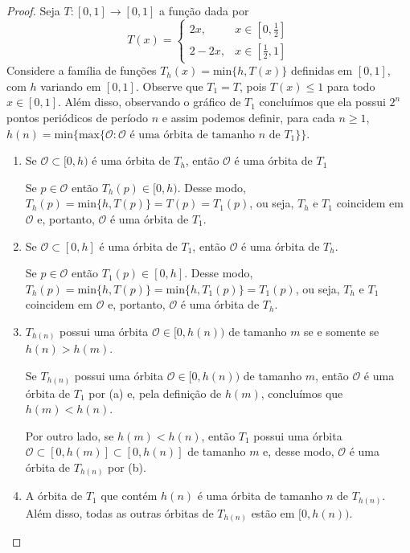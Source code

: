 \begin{proof}
Seja $T: [0,1] \to [0,1]$ a função dada por
\[
T(x) = 
  \begin{cases}
      2x, & x \in \left[0, \frac{1}{2}\right] \\
      2 - 2x, & x \in \left[\frac{1}{2}, 1\right] 
  \end{cases}
\]
Considere a família de funções $T_h(x) = \textrm{min}\{h, T(x)\}$ definidas em $[0,1]$, com $h$ variando em $[0,1]$. Observe que $T_1 = T$, pois $T(x) \leq 1$ para todo $x \in [0,1]$. Além disso, observando o gráfico de $T_1$ concluímos que ela possui $2^n$ pontos periódicos de período $n$ e assim podemos definir, para cada $n \geq 1$, $h(n) = \textrm{min} \{ \textrm{max} \{ \mathcal{O} : \mathcal{O} \textrm{ é uma órbita de tamanho } n \textrm{ de } T_1\} \}$. 

\begin{enumerate}[label = (\alph*)]
\item Se $\mathcal{O} \subset [0, h)$ é uma órbita de $T_h$, então $\mathcal{O}$ é uma órbita de $T_1$

Se $p \in \mathcal{O}$ então $T_h(p) \in [0, h)$. Desse modo, $T_h(p) = \textrm{min}\{h, T(p)\} = T(p) = T_1(p)$, ou seja, $T_h$ e $T_1$ coincidem em $\mathcal{O}$ e, portanto, $\mathcal{O}$ é uma órbita de $T_1$.

\item Se $\mathcal{O} \subset [0, h]$ é uma órbita de $T_1$, então $\mathcal{O}$ é uma órbita de $T_h$.

Se $p \in \mathcal{O}$ então $T_1(p) \in [0, h]$. Desse modo, $T_h(p) = \textrm{min}\{h, T(p)\} = \textrm{min}\{h, T_1(p)\} = T_1(p)$, ou seja, $T_h$ e $T_1$ coincidem em $\mathcal{O}$ e, portanto, $\mathcal{O}$ é uma órbita de $T_h$.

\item $T_{h(n)}$ possui uma órbita $\mathcal{O} \in [0, h(n))$ de tamanho $m$ se e somente se $h(n) > h(m)$.

Se $T_{h(n)}$ possui uma órbita $\mathcal{O} \in [0, h(n))$ de tamanho $m$, então $\mathcal{O}$ é uma órbita de $T_1$ por (a) e, pela definição de $h(m)$, concluímos que $h(m) < h(n)$.

Por outro lado, se $h(m) < h(n)$, então $T_1$ possui uma órbita $\mathcal{O} \subset [0, h(m)] \subset [0, h(n)]$ de tamanho $m$ e, desse modo, $\mathcal{O}$ é uma órbita de $T_{h(n)}$ por (b).

\item A órbita de $T_1$ que contém $h(n)$ é uma órbita de tamanho $n$ de $T_{h(n)}$. Além disso, todas as outras órbitas de $T_{h(n)}$ estão em $[0, h(n))$. 


\end{enumerate}
\end{proof}
